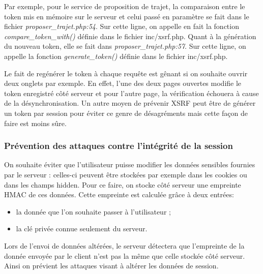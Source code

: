 \documentclass[a4paper]{article}
\begin{document}
Par exemple, pour le service de proposition de trajet, la comparaison entre
le token mis en mémoire sur le serveur et celui passé en paramètre se fait
dans le fichier \textit{proposer\_trajet.php:54}. Sur cette ligne, on appelle en
fait la fonction \textit{compare\_token\_with()} définie dans le fichier
inc/xsrf.php. Quant à la génération du nouveau token, elle se fait dans
\textit{proposer\_trajet.php:57}.  Sur cette ligne, on appelle la fonction
\textit{generate\_token()} définie dans le fichier inc/xsrf.php.
 		
Le fait de regénérer le token à chaque requête est gênant si on
souhaite ouvrir deux onglets par exemple. En effet, l'une des deux
pages ouvertes modifie le token enregistré côté serveur et pour l'autre
page, la vérification échouera à cause de la désynchronisation.
Un autre moyen de prévenir XSRF peut être de générer un token par
session pour éviter ce genre de désagréments mais cette façon de faire
est moins sûre.
 		
\subsubsection{Prévention des attaques contre l'intégrité de la session}
On souhaite éviter que l'utilisateur puisse modifier les données sensibles fournies par le serveur : 
celles-ci peuvent être stockées par exemple dans les cookies ou dans les champs hidden. 
Pour ce faire, on stocke côté serveur une empreinte
HMAC de ces données. Cette empreinte est
calculée grâce à deux entrées:

\begin{itemize}
	\item la donnée que l'on souhaite passer à l'utilisateur ;
	\item la clé privée connue seulement du serveur.
\end{itemize}

Lors de l'envoi de données altérées,
le serveur détectera que l'empreinte de la donnée envoyée par le client
n'est pas la même que celle stockée côté serveur. Ainsi on prévient les
attaques visant à altérer les données de session.
\end{document}
